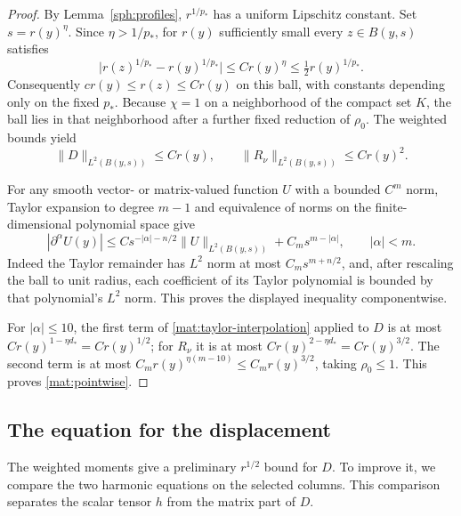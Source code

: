 \begin{proof}
By Lemma~\ref{sph:profiles}, $r^{1/p_*}$ has a uniform Lipschitz
constant.  Set $s=r(y)^\eta$.  Since
$\eta>1/p_*$, for $r(y)$ sufficiently small every $z\in B(y,s)$
satisfies
\[
 \big|r(z)^{1/p_*}-r(y)^{1/p_*}\big|
       \le C r(y)^\eta\le\tfrac12 r(y)^{1/p_*}.
\]
Consequently $c r(y)\le r(z)\le C r(y)$ on this ball, with constants
depending only on the fixed $p_*$.  Because $\chi=1$ on a neighborhood
of the compact set $K$, the ball lies in that neighborhood after a
further fixed reduction of $\rho_0$.  The weighted bounds yield
\[
 \|D\|_{L^2(B(y,s))}\le Cr(y),\qquad
 \|R_\nu\|_{L^2(B(y,s))}\le Cr(y)^2.
\]

For any smooth vector- or matrix-valued function $U$ with a bounded
$C^m$ norm, Taylor expansion to degree $m-1$ and equivalence of norms
on the finite-dimensional polynomial space give
\begin{equation}
 |\partial^\alpha U(y)|
    \le C s^{-|\alpha|-n/2}\|U\|_{L^2(B(y,s))}
                    +C_m s^{m-|\alpha|},\qquad |\alpha|<m.
 \label{mat:taylor-interpolation}
\end{equation}
Indeed the Taylor remainder has $L^2$ norm at most
$C_m s^{m+n/2}$, and, after rescaling the ball to unit radius, each
coefficient of its Taylor polynomial is bounded by that polynomial's
$L^2$ norm.  This proves the displayed inequality componentwise.

For $|\alpha|\le10$, the first term of
\eqref{mat:taylor-interpolation} applied to $D$ is at most
$Cr(y)^{1-\eta d_*}=Cr(y)^{1/2}$; for $R_\nu$ it is at most
$Cr(y)^{2-\eta d_*}=Cr(y)^{3/2}$.  The second term is at most
$C_m r(y)^{\eta(m-10)}\le C_m r(y)^{3/2}$, taking
$\rho_0\le1$.  This proves \eqref{mat:pointwise}.
\end{proof}

\subsection{The equation for the displacement}

The weighted moments give a preliminary $r^{1/2}$ bound for $D$.
To improve it, we compare the two harmonic equations on the selected
columns.  This comparison separates the scalar tensor $h$ from the
matrix part of $D$.

